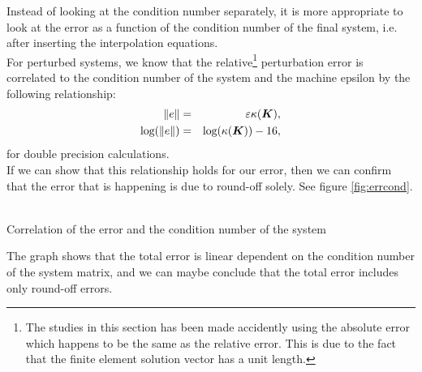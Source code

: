 \documentclass[a4paper,12pt]{article}
\makeatletter
\newcommand{\mb}[1]{{\mbox{\boldmath$#1$\unboldmath}}}
\newenvironment{figurehere}
  {\def\@captype{figure}}
  {}
\makeatother
\begin{document}
Instead of looking at the condition number separately, it is more appropriate to look at the error as a function of the condition number of the final system, i.e. after inserting the interpolation equations.\\
For perturbed systems, we know that the relative\footnote{The studies in this section has been made accidently using the absolute error which happens to be the same as the relative error. This is due to the fact that the finite element solution vector has a unit length.} perturbation error is correlated to the condition number of the system and the machine epsilon by the following relationship:
\begin{eqnarray}
 \Vert e\Vert &=& \varepsilon\kappa(\mb{K}),\\
\text{log}(\Vert e\Vert) &=& \text{log}(\kappa(\mb{K})) - 16,
\end{eqnarray}
for double precision calculations.\\
If we can show that this relationship holds for our error, then we can confirm that the error that is happening is due to round-off solely. See figure \ref{fig:errcond}.\\
\begin{center}
\begin{figurehere}
\\
\caption{Correlation of the error and the condition number of the system}\label{fig:errcond}
\end{figurehere}
\end{center}
The graph shows that the total error is linear dependent on the condition number of the system matrix, and we can maybe conclude that the total error includes only round-off errors.\\
\end{document}
